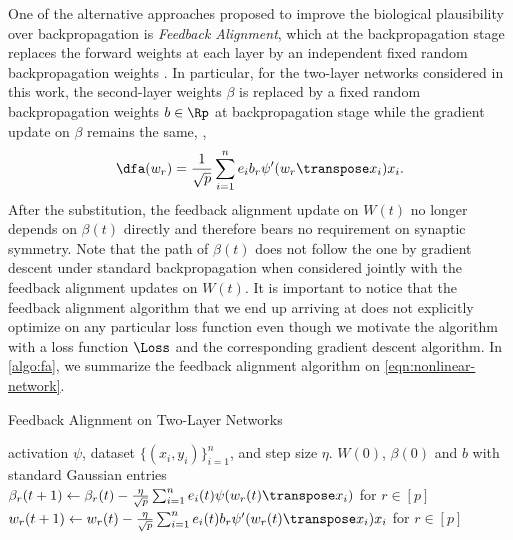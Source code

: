 One of the alternative approaches proposed to improve the biological plausibility over backpropagation is \emph{Feedback Alignment}, which at the backpropagation stage replaces the forward weights at each layer by an independent fixed random backpropagation weights \citep{lillicrap2016random}. In particular, for the two-layer networks considered in this work, the second-layer weights $\beta$ is replaced by a fixed random backpropagation weights $b\in\Rp$ at backpropagation stage while the gradient update on $\beta$ remains the same, \ie,
\begin{align}\label{eqn:alignment-update}
    \dfa(w_r) = \frac{1}{\sqrt{p}} \sum_{i=1}^n e_i b_r\psi'(w_r\transpose x_i)x_i.
\end{align}
After the substitution, the feedback alignment update on $W(t)$ no longer depends on $\beta(t)$ directly and therefore bears no requirement on synaptic symmetry. Note that the path of $\beta(t)$ does not follow the one by gradient descent under standard backpropagation when considered jointly with the feedback alignment updates on $W(t)$. It is important to notice that the feedback alignment algorithm that we end up arriving at does not explicitly optimize on any particular loss function even though we motivate the algorithm with a loss function $\Loss$ and the corresponding gradient descent algorithm.
In \cref{algo:fa}, we summarize the feedback alignment algorithm on \eqref{eqn:nonlinear-network}.

\begin{algorithm}[H]
\centering
\caption{Feedback Alignment on Two-Layer Networks}\label{algo:fa}
    \begin{algorithmic}[1]
        \Require activation $\psi$, dataset $\{(x_i,y_i)\}_{i=1}^n$, and step size $\eta$.
         $W(0)$, $\beta(0)$ and $b$ with standard Gaussian entries
            \State $\beta_r(t+1) \gets \beta_r(t) - \frac{\eta}{\sqrt p} \sum_{i=1}^n e_i(t)\psi(w_r(t)\transpose x_i)$ for $r\in[p]$
            \State $w_r(t+1) \gets w_r(t) - \frac{\eta}{\sqrt{p}} \sum_{i=1}^n e_i(t) b_r\psi'(w_r(t)\transpose x_i)x_i$ for $r\in[p]$
        \EndWhile
    \end{algorithmic}    
\end{algorithm}%


